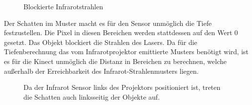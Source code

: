 \begin{figure}[!ht]
  \centering
   \caption{Blockierte Infrarotstrahlen }
\end{figure}
Der Schatten im Muster macht es für den Sensor unmöglich die Tiefe festzustellen. Die Pixel in diesen Bereichen werden stattdessen auf den Wert 0 gesetzt.
Das Objekt blockiert die Strahlen des Lasers. Da für die Tiefenberechnung das vom Infrarotprojektor emittierte Musters benötigt wird, ist es für die Kinect unmöglich die Distanz in Bereichen zu berechnen, welche außerhalb der Erreichbarkeit des Infrarot-Strahlenmusters liegen. 
\begin{figure}[!ht]
  \centering
   \caption{Da der Infrarot Sensor links des Projektors positioniert ist, treten die Schatten auch linksseitig der Objekte auf.  }
\end{figure}